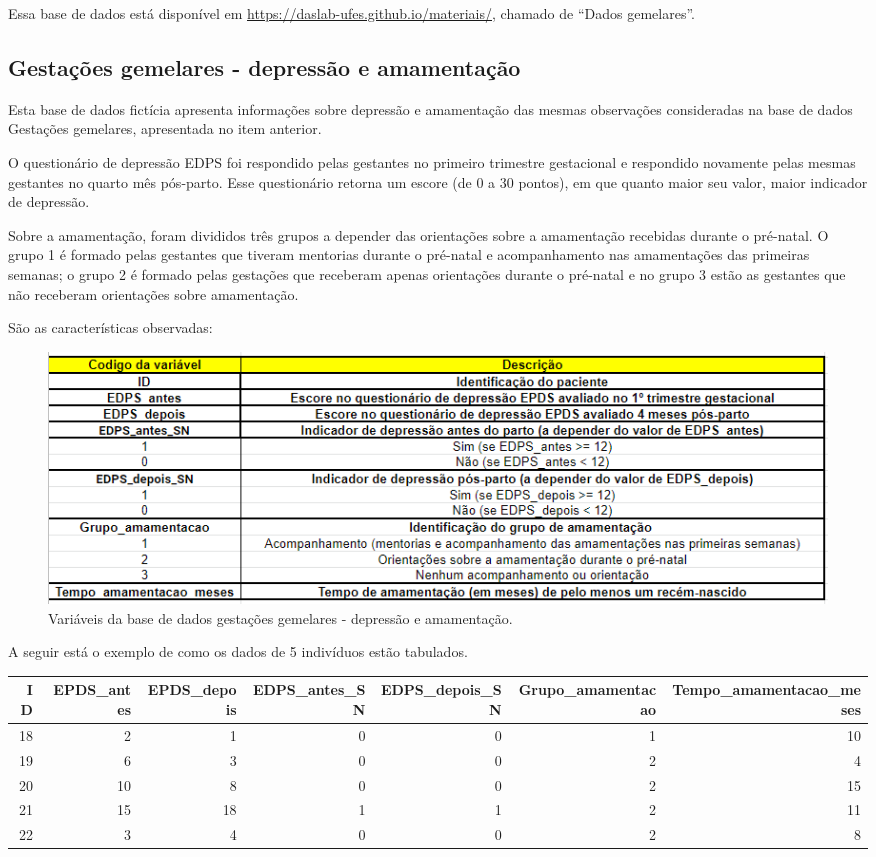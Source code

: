 \documentclass[
]{book}
\begin{document}
Essa base de dados está disponível em \url{https://daslab-ufes.github.io/materiais/}, chamado de ``Dados gemelares''.

\hypertarget{gestauxe7uxf5es-gemelares---depressuxe3o-e-amamentauxe7uxe3o}{%
\subsection{Gestações gemelares - depressão e amamentação}\label{gestauxe7uxf5es-gemelares---depressuxe3o-e-amamentauxe7uxe3o}}

Esta base de dados fictícia apresenta informações sobre depressão e amamentação das mesmas observações consideradas na base de dados Gestações gemelares, apresentada no item anterior.

O questionário de depressão EDPS foi respondido pelas gestantes no primeiro trimestre gestacional e respondido novamente pelas mesmas gestantes no quarto mês pós-parto. Esse questionário retorna um escore (de 0 a 30 pontos), em que quanto maior seu valor, maior indicador de depressão.

Sobre a amamentação, foram divididos três grupos a depender das orientações sobre a amamentação recebidas durante o pré-natal. O grupo 1 é formado pelas gestantes que tiveram mentorias durante o pré-natal e acompanhamento nas amamentações das primeiras semanas; o grupo 2 é formado pelas gestações que receberam apenas orientações durante o pré-natal e no grupo 3 estão as gestantes que não receberam orientações sobre amamentação.

São as características observadas:

\begin{figure}
\includegraphics[width=1\linewidth]{figures/dicionario_dados_progest2} \caption{Variáveis da base de dados gestações gemelares - depressão e amamentação.}\label{fig:dic2}
\end{figure}

A seguir está o exemplo de como os dados de 5 indivíduos estão tabulados.

\begin{tabular}{r|r|r|r|r|r|r}
\hline
ID & EPDS\_antes & EPDS\_depois & EDPS\_antes\_SN & EDPS\_depois\_SN & Grupo\_amamentacao & Tempo\_amamentacao\_meses\\
\hline
18 & 2 & 1 & 0 & 0 & 1 & 10\\
\hline
19 & 6 & 3 & 0 & 0 & 2 & 4\\
\hline
20 & 10 & 8 & 0 & 0 & 2 & 15\\
\hline
21 & 15 & 18 & 1 & 1 & 2 & 11\\
\hline
22 & 3 & 4 & 0 & 0 & 2 & 8\\
\hline
\end{tabular}
\end{document}
